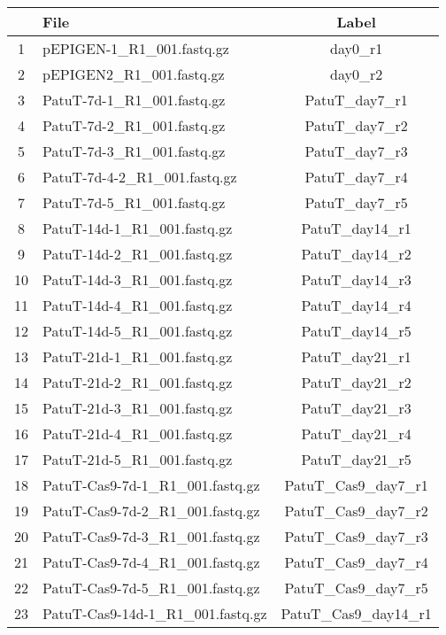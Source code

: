 \documentclass{article}
\begin{document}
\begin{table}[ht]
\centering
\begin{tabular}{cp{9cm}c}
  \hline
 & File & Label \\ 
  \hline
1 & pEPIGEN-1\_R1\_001.fastq.gz & day0\_r1 \\ 
  2 & pEPIGEN2\_R1\_001.fastq.gz & day0\_r2 \\ 
  3 & PatuT-7d-1\_R1\_001.fastq.gz & PatuT\_day7\_r1 \\ 
  4 & PatuT-7d-2\_R1\_001.fastq.gz & PatuT\_day7\_r2 \\ 
  5 & PatuT-7d-3\_R1\_001.fastq.gz & PatuT\_day7\_r3 \\ 
  6 & PatuT-7d-4-2\_R1\_001.fastq.gz & PatuT\_day7\_r4 \\ 
  7 & PatuT-7d-5\_R1\_001.fastq.gz & PatuT\_day7\_r5 \\ 
  8 & PatuT-14d-1\_R1\_001.fastq.gz & PatuT\_day14\_r1 \\ 
  9 & PatuT-14d-2\_R1\_001.fastq.gz & PatuT\_day14\_r2 \\ 
  10 & PatuT-14d-3\_R1\_001.fastq.gz & PatuT\_day14\_r3 \\ 
  11 & PatuT-14d-4\_R1\_001.fastq.gz & PatuT\_day14\_r4 \\ 
  12 & PatuT-14d-5\_R1\_001.fastq.gz & PatuT\_day14\_r5 \\ 
  13 & PatuT-21d-1\_R1\_001.fastq.gz & PatuT\_day21\_r1 \\ 
  14 & PatuT-21d-2\_R1\_001.fastq.gz & PatuT\_day21\_r2 \\ 
  15 & PatuT-21d-3\_R1\_001.fastq.gz & PatuT\_day21\_r3 \\ 
  16 & PatuT-21d-4\_R1\_001.fastq.gz & PatuT\_day21\_r4 \\ 
  17 & PatuT-21d-5\_R1\_001.fastq.gz & PatuT\_day21\_r5 \\ 
  18 & PatuT-Cas9-7d-1\_R1\_001.fastq.gz & PatuT\_Cas9\_day7\_r1 \\ 
  19 & PatuT-Cas9-7d-2\_R1\_001.fastq.gz & PatuT\_Cas9\_day7\_r2 \\ 
  20 & PatuT-Cas9-7d-3\_R1\_001.fastq.gz & PatuT\_Cas9\_day7\_r3 \\ 
  21 & PatuT-Cas9-7d-4\_R1\_001.fastq.gz & PatuT\_Cas9\_day7\_r4 \\ 
  22 & PatuT-Cas9-7d-5\_R1\_001.fastq.gz & PatuT\_Cas9\_day7\_r5 \\ 
  23 & PatuT-Cas9-14d-1\_R1\_001.fastq.gz & PatuT\_Cas9\_day14\_r1 \\ 

\end{tabular}
\end{table}
\end{document}
